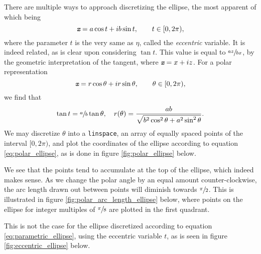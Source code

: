 There are multiple ways to approach discretizing the ellipse, the most apparent of which being
\begin{equation}\label{eq:parametric_ellipse}
  {\textit{\texttt{x}}} = a\cos{t} + ib\sin{t}, \qquad t \in [0, 2\pi),
\end{equation}
where the parameter $t$ is the very same as $\eta$, called the \emph{eccentric} variable.
It is indeed related, as is clear upon considering $\tan{t}$.
This value is equal to $\sfrac{az}{bx}$, by the geometric interpretation of the tangent, where ${\textit{\texttt{x}}} = x + iz$.
For a polar representation
\begin{equation}\label{eq:polar_ellipse}
{\textit{\texttt{x}}} = r\cos{\theta} + ir\sin{\theta}, \qquad \theta \in [0, 2\pi),
\end{equation}
we find that
\[
\tan{t} = \sfrac{a}{b} \tan{\theta}, \quad r(\theta) = \frac{ab}{\sqrt{b^2 \cos^2{\theta} + a^2 \sin^2{\theta}}}.
\]
We may discretize $\theta$ into a \texttt{linspace}, an array of equally spaced points of the interval $[0, 2\pi)$, and plot the coordinates of the ellipse according to equation \eqref{eq:polar_ellipse}, as is done in figure \ref{fig:polar_ellipse} below.
\begin{Figure}
  \centering
  \scalebox{1}{%
    
  }
  \captionsetup{type = figure}
  \caption{Ellipse parametrized with the polar variable $\theta$, according to equation \eqref{eq:polar_ellipse}.}
  \label{fig:polar_ellipse}
\end{Figure}
We see that the points tend to accumulate at the top of the ellipse, which indeed makes sense.
As we change the polar angle by an equal amount counter-clockwise, the arc length drawn out between points will diminish towards $\sfrac{\pi}{2}$.
This is illustrated in figure \ref{fig:polar_arc_length_ellipse} below, where points on the ellipse for integer multiples of $\sfrac{\pi}{8}$ are plotted in the first quadrant.
\begin{Figure}
  \centering
  \scalebox{1}{%
    
  }
  \captionsetup{type = figure}
  \caption{Demonstration that the arc length between points decreases clockwise in the first quadrant as the polar angle $\theta$ approaches $\sfrac{\pi}{2}$.}
  \label{fig:polar_arc_length_ellipse}
\end{Figure}
This is not the case for the ellipse discretized according to equation \eqref{eq:parametric_ellipse}, using the eccentric variable $t$, as is seen in figure \ref{fig:eccentric_ellipse} below.
\begin{Figure}
  \centering
  \scalebox{1}{%
    
  }
  \captionsetup{type = figure}
  \caption{Ellipse parametrized with the eccentric variable $t$, according to equation \eqref{eq:parametric_ellipse}.}
  \label{fig:eccentric_ellipse}
\end{Figure}
